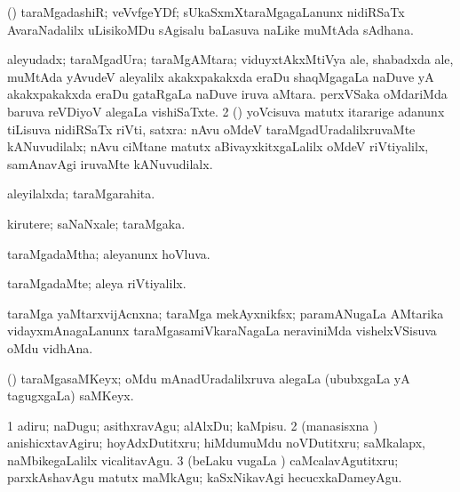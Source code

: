 \bentry
{} 
\gl{\nA}
\expl{}
\bmng
(\viduyx) taraMgadashiR; veVvfgeYDf; sUkaSxmXtaraMgagaLanunx nidiRSaTx AvaraNadalilx uLisikoMDu sAgisalu baLasuva naLike muMtAda sAdhana. 
\emng
\eentry

\bentry
{} 
\gl{\nA}
\expl{}
\bmng
\bnum
{} 
\banum
{} aleyudadx; taraMgadUra; taraMgAMtara; viduyxtAkxMtiVya ale, shabadxda ale, muMtAda yAvudeV aleyalilx akakxpakakxda eraDu shaqMgagaLa naDuve yA akakxpakakxda eraDu gataRgaLa naDuve iruva aMtara. 
 perxVSaka oMdariMda baruva reVDiyoV alegaLa vishiSaTxte. 
\eanum
\numie
\num{2} (\AmA) yoVcisuva matutx itararige adanunx tiLisuva nidiRSaTx riVti, satxra:  nAvu oMdeV taraMgadUradalilxruvaMte kANuvudilalx; nAvu ciMtane matutx aBivayxkitxgaLalilx oMdeV riVtiyalilx, samAnavAgi iruvaMte kANuvudilalx. 
\enum
\emng
\eentry

\bentry
{} 
\gl{\gu}
\expl{}
\bmng
aleyilalxda; taraMgarahita. 
\emng
\eentry

\bentry
{} 
\gl{\nA}
\expl{}
\bmng
kirutere; saNaNxale; taraMgaka. 
\emng
\eentry

\bentry
{} 
\gl{\gu}
\expl{}
\bmng
taraMgadaMtha; aleyanunx hoVluva. 
\emng
\eentry

\bentry
{} 
\gl{\kirxvi}
\expl{}
\bmng
taraMgadaMte; aleya riVtiyalilx. 
\emng
\eentry

\bentry
{} 
\gl{\nA}
\expl{}
\bmng
taraMga yaMtarxvijAcnxna; taraMga mekAyxnikfsx; paramANugaLa AMtarika vidayxmAnagaLanunx taraMgasamiVkaraNagaLa neraviniMda vishelxVSisuva oMdu vidhAna. 
\emng
\eentry

\bentry
{} 
\gl{\nA}
\expl{}
\bmng
(\Bwvi) taraMgasaMKeyx; oMdu mAnadUradalilxruva alegaLa (ububxgaLa yA tagugxgaLa) saMKeyx. 
\emng
\eentry

\bentry
{} 
\gl{\akirx}
\expl{}
\bmng
\bnum
\num{1} adiru; naDugu; asithxravAgu; alAlxDu; kaMpisu. 
\num{2} (manasisxna \vi) anishicxtavAgiru; hoyAdxDutitxru; hiMdumuMdu noVDutitxru; saMkalapx, naMbikegaLalilx vicalitavAgu. 
\num{3} (beLaku \mo vugaLa \vi) caMcalavAgutitxru; parxkAshavAgu matutx maMkAgu; kaSxNikavAgi hecucxkaDameyAgu. 
\enum
\emng
\eentry

